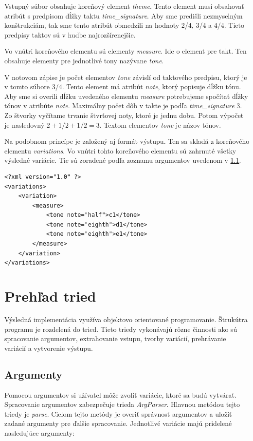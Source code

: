 Vstupný súbor obsahuje koreňový element \textit{theme}. Tento element musí obsahovať atribút s predpisom dĺžky taktu \textit{time\_signature}. Aby sme predišli nezmyselným konštrukciám, tak sme tento atribút obmedzili na hodnoty 2/4, 3/4 a 4/4. Tieto predpisy taktov sú v hudbe najrozšírenejšie.

Vo vnútri koreňového elementu sú elementy \textit{measure}. Ide o element pre takt. Ten obsahuje elementy pre jednotlivé tony nazývane \textit{tone}.

V notovom zápise je počet elementov \textit{tone} závislí od taktového predpisu, ktorý je v tomto súbore 3/4. Tento element má atribút \textit{note}, ktorý popisuje dĺžku tónu. Aby sme si overili dĺžku uvedeného elementu \textit{measure} potrebujeme spočítať dĺžky tónov v atribúte \textit{note}. Maximálny počet dôb v takte je podľa \textit{time\_signature} 3. Zo štvorky vyčítame trvanie štvrťovej noty, ktoré je jednu dobu. Potom výpočet je nasledovný $2 + 1/2 + 1/2 = 3.$ Textom elementov \textit{tone} je názov tónov.

Na podobnom princípe je založený aj formát výstupu. Ten sa skladá z koreňového elementu \textit{variations}. Vo vnútri tohto koreňového elementu sú zahrnuté všetky výsledné variácie. Tie sú zoradené podľa zoznamu argumentov uvedenom v \ref{args}.
\lstset{language=XML}
\begin{lstlisting}
<?xml version="1.0" ?>
<variations>
	<variation>
		<measure>
			<tone note="half">c1</tone>
			<tone note="eighth">d1</tone>
			<tone note="eighth">e1</tone>
		</measure>
	</variation>
</variations>
\end{lstlisting}

\section{Prehľad tried}
Výsledná implementácia využíva objektovo orientované programovanie. Štrukútra programu je rozdelená do tried. Tieto triedy vykonávajú rôzne činnosti ako sú spracovanie argumentov, extrahovanie vstupu, tvorby variácií, prehrávanie variácií a vytvorenie výstupu.

\subsection{Argumenty}
\label{args}
Pomocou argumentov si užívateľ môže zvoliť variácie, ktoré sa budú vytvárať. Spracovanie argumentov zabezpečuje trieda \textit{ArgParser}. Hlavnou metódou tejto triedy je \textit{parse}. Cieľom tejto metódy je overiť správnosť argumentov a uložiť zadané argumenty pre ďalšie spracovanie. Jednotlivé variácie majú pridelené nasledujúce argumenty:

